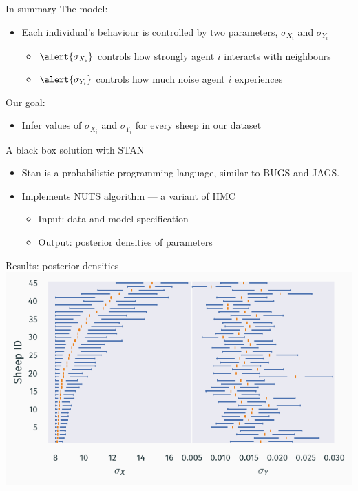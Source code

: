 \documentclass[12pt]{beamer}
\renewcommand{\emph}[1]{{\color{mLightBrown}#1}}
\begin{document}
\begin{frame}{In summary}
    The model:
    \begin{itemize}
        \setlength\itemsep{1em}
        \item Each individual's behaviour is controlled by two parameters, \alert{$\sigma_{X_i}$}
            and \alert{$\sigma_{Y_i}$}
        \begin{itemize}
        \setlength\itemsep{0.3em}
            \item $\alert{\sigma_{X_i}}$ controls how \alert{strongly} agent $i$ \alert{interacts}
                with neighbours
            \item $\alert{\sigma_{Y_i}}$ controls how much \alert{noise} agent $i$ \alert{experiences}
        \end{itemize}
    \end{itemize}

    Our goal:
    \begin{itemize}
        \setlength\itemsep{1em}
        \item Infer values of $\sigma_{X_i}$ and $\sigma_{Y_i}$ for every sheep in our dataset
    \end{itemize}
\end{frame}

\begin{frame}{A black box solution with STAN}
    \begin{itemize}
        \setlength\itemsep{1em}
        \item Stan is a probabilistic programming language, similar to BUGS and JAGS.
        \item Implements \emph{NUTS} algorithm --- a variant of \emph{HMC}
        \begin{itemize}
            \setlength\itemsep{0.3em}
            \item \alert{Input}: data and model specification
            \item \alert{Output}: posterior densities of parameters
        \end{itemize}
    \end{itemize}
\end{frame}

\begin{frame}{Results: posterior densities}
    \vspace{0.85cm}
    \centering
    \includegraphics{summary_output.pdf}
\end{frame}
\end{document}
